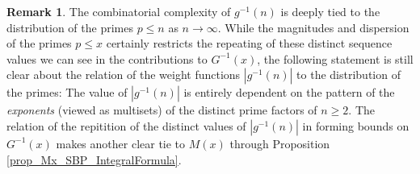 \documentclass[11pt,reqno,a4letter]{article}
\numberwithin{figure}{section}
\numberwithin{table}{section}
\theoremstyle{plain}
\numberwithin{theorem}{section}
\theoremstyle{definition}
\newtheorem{remark}[theorem]{Remark}
\begin{document}
\begin{remark} 
The combinatorial complexity of $g^{-1}(n)$ is deeply tied to the distribution of the primes 
$p \leq n$ as $n \rightarrow \infty$. 
While the magnitudes and dispersion of the primes $p \leq x$ certainly restricts the 
repeating of these distinct sequence 
values we can see in the contributions to $G^{-1}(x)$, the following 
statement is still clear about the relation of the weight functions $|g^{-1}(n)|$ to the 
distribution of the primes: 
The value of $|g^{-1}(n)|$ is entirely dependent on the pattern of the \emph{exponents} 
(viewed as multisets) of the distinct prime factors of $n \geq 2$. 
The relation of the repitition of the distinct values 
of $|g^{-1}(n)|$ in forming bounds on $G^{-1}(x)$ makes another clear tie to 
$M(x)$ through Proposition \ref{prop_Mx_SBP_IntegralFormula}. 
\end{remark}
\end{document}
